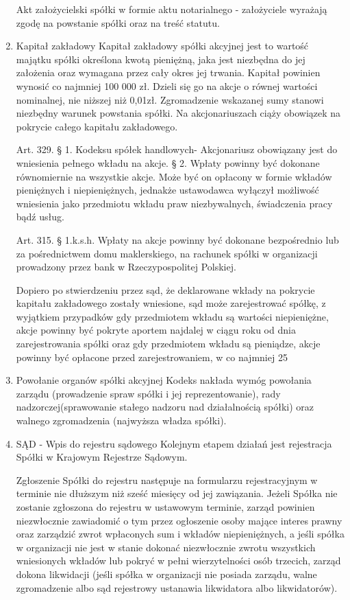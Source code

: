 \documentclass[a4paper, 11pt]{article}
\begin{document}
\begin{enumerate}
Akt założycielski spółki w formie aktu notarialnego - założyciele wyrażają zgodę na powstanie spółki oraz na treść statutu.
\item Kapitał zakładowy
Kapitał zakładowy spółki akcyjnej jest to wartość majątku spółki określona kwotą pieniężną, jaka jest niezbędna do jej założenia oraz wymagana przez cały okres jej trwania. Kapitał powinien wynosić co najmniej 100 000 zł. Dzieli się go na akcje o równej wartości nominalnej, nie niższej niż 0,01zł. Zgromadzenie wskazanej sumy stanowi niezbędny warunek powstania spółki. Na akcjonariuszach ciąży obowiązek na pokrycie całego kapitału zakładowego.

Art. 329. § 1. Kodeksu spółek handlowych- Akcjonariusz obowiązany jest do wniesienia pełnego wkładu na akcje. § 2. Wpłaty powinny być dokonane równomiernie na wszystkie akcje. Może być on opłacony w formie wkładów pieniężnych i niepieniężnych, jednakże ustawodawca wyłączył możliwość wniesienia jako przedmiotu wkładu praw niezbywalnych, świadczenia pracy bądź usług.

Art. 315. § 1.k.s.h. Wpłaty na akcje powinny być dokonane bezpośrednio lub za pośrednictwem domu maklerskiego, na rachunek spółki w organizacji prowadzony przez bank w Rzeczypospolitej Polskiej.

Dopiero po stwierdzeniu przez sąd, że deklarowane wkłady na pokrycie kapitału zakładowego zostały wniesione, sąd może zarejestrować spółkę, z wyjątkiem przypadków gdy przedmiotem wkładu są wartości niepieniężne, akcje powinny być pokryte aportem najdalej w ciągu roku od dnia zarejestrowania spółki oraz gdy przedmiotem wkładu są pieniądze, akcje powinny być opłacone przed zarejestrowaniem, w co najmniej 25%

\item Powołanie organów spółki akcyjnej
Kodeks nakłada wymóg powołania zarządu (prowadzenie spraw spółki i jej reprezentowanie), rady nadzorczej(sprawowanie stałego nadzoru nad działalnością spółki) oraz walnego zgromadzenia (najwyższa władza spółki).

\item SĄD - Wpis do rejestru sądowego 
Kolejnym etapem działań jest rejestracja Spółki w Krajowym Rejestrze Sądowym.
 
Zgłoszenie Spółki do rejestru następuje na formularzu rejestracyjnym w terminie nie dłuższym niż sześć miesięcy od jej zawiązania. Jeżeli Spółka nie zostanie zgłoszona do rejestru w ustawowym terminie, zarząd powinien niezwłocznie zawiadomić o tym przez ogłoszenie osoby mające interes prawny oraz zarządzić zwrot wpłaconych sum i wkładów niepieniężnych, a jeśli spółka w organizacji nie jest w stanie dokonać niezwłocznie zwrotu wszystkich wniesionych wkładów lub pokryć w pełni wierzytelności osób trzecich, zarząd dokona likwidacji (jeśli spółka w organizacji nie posiada zarządu, walne zgromadzenie albo sąd rejestrowy ustanawia likwidatora albo likwidatorów).
 

\end{enumerate}
\end{document}
